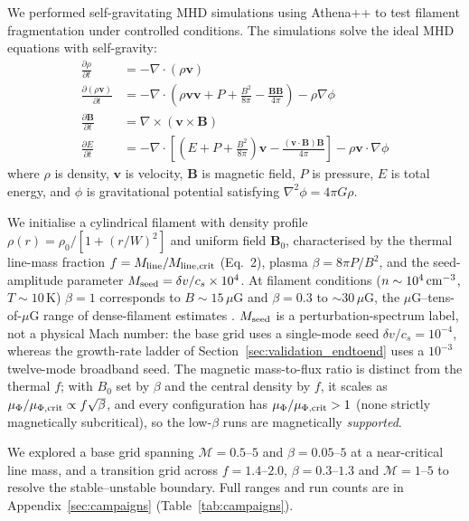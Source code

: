 \documentclass[usenatbib,twoside,twocolumn]{mnras}
\begin{document}
We performed self-gravitating MHD simulations using Athena++ \citep{Stone2020} to test filament fragmentation under controlled conditions. The simulations solve the ideal MHD equations with self-gravity:
\begin{align}
\frac{\partial \rho}{\partial t} &= -\nabla \cdot (\rho \mathbf{v}) \\
\frac{\partial (\rho \mathbf{v})}{\partial t} &= -\nabla \cdot \left(\rho \mathbf{v} \mathbf{v} + P + \frac{B^2}{8\pi} - \frac{\mathbf{B}\mathbf{B}}{4\pi}\right) - \rho \nabla \phi \\
\frac{\partial \mathbf{B}}{\partial t} &= \nabla \times (\mathbf{v} \times \mathbf{B}) \\
\frac{\partial E}{\partial t} &= -\nabla \cdot \left[(E + P + \frac{B^2}{8\pi})\mathbf{v} - \frac{(\mathbf{v} \cdot \mathbf{B})\mathbf{B}}{4\pi}\right] - \rho \mathbf{v} \cdot \nabla \phi
\end{align}
where $\rho$ is density, $\mathbf{v}$ is velocity, $\mathbf{B}$ is magnetic field, $P$ is pressure, $E$ is total energy, and $\phi$ is gravitational potential satisfying $\nabla^2 \phi = 4\pi G\rho$.

We initialise a cylindrical filament with density profile $\rho(r)=\rho_0/[1+(r/W)^2]$ and uniform field $\mathbf{B}_0$, characterised by the thermal line-mass fraction $f=M_{\rm line}/M_{\rm line,crit}$ (Eq.~2), plasma $\beta=8\pi P/B^2$, and the seed-amplitude parameter $M_{\rm seed}=\delta v/c_s\times10^{4}$. At filament conditions ($n\sim10^4\,{\rm cm^{-3}}$, $T\sim10$\,K) $\beta=1$ corresponds to $B\sim15\,\mu$G and $\beta=0.3$ to $\sim30\,\mu$G, the $\mu$G--tens-of-$\mu$G range of dense-filament estimates \citep{Crutcher2012}. $M_{\rm seed}$ is a perturbation-spectrum label, not a physical Mach number: the base grid uses a single-mode seed $\delta v/c_s=10^{-4}$, whereas the growth-rate ladder of Section~\ref{sec:validation_endtoend} uses a $10^{-3}$ twelve-mode broadband seed. The magnetic mass-to-flux ratio is distinct from the thermal $f$; with $B_0$ set by $\beta$ and the central density by $f$, it scales as $\mu_\Phi/\mu_{\Phi,\rm crit}\propto f\sqrt{\beta}$, and every configuration has $\mu_\Phi/\mu_{\Phi,\rm crit}>1$ (none strictly magnetically subcritical), so the low-$\beta$ runs are magnetically \emph{supported}.

We explored a base grid spanning $\mathcal{M}=0.5$--$5$ and $\beta=0.05$--$5$ at a near-critical line mass, and a transition grid across $f=1.4$--$2.0$, $\beta=0.3$--$1.3$ and $\mathcal{M}=1$--$5$ to resolve the stable--unstable boundary. Full ranges and run counts are in Appendix~\ref{sec:campaigns} (Table~\ref{tab:campaigns}).
\end{document}
